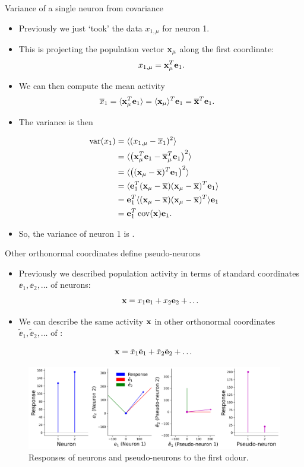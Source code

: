 \documentclass[presentation,smaller]{beamer}
\begin{document}
\begin{frame}[label={sec:org445c9ca}]{Variance of a single neuron from covariance}
\begin{itemize}
\item Previously we just `took' the data \(x_{1,\mu}\)  for neuron 1.
\item This is projecting the population vector \(\mathbf{x}_\mu\) along the first coordinate: $$x_{1,\mu} = \mathbf{x}_\mu^T \mathbf e_1.$$
\item We can then compute the mean activity
\begin{align*}
\overline{x}_1 &= \langle \mathbf{x}_\mu^T \mathbf e_1 \rangle = \langle \mathbf{x}_\mu \rangle^T \mathbf e_1 = \overline{\mathbf{x}}^T  \mathbf e_1.
\end{align*}
\item The variance is then
\end{itemize}
\begin{align*}
 \operatorname{var}(x_1) &= \langle (x_{1,\mu}- \overline{x}_1)^2 \rangle \\
&= \langle \left( \mathbf{x}_\mu^T \mathbf e_1  - \overline{\mathbf{x}}_\mu^T \mathbf e_1 \right)^2 \rangle\\
&= \langle \left( (\mathbf{x}_\mu - \overline{\mathbf{x}})^T\mathbf e_1 \right)^2 \rangle\\
&= \langle \mathbf e_1^T(\mathbf{x}_\mu - \overline{\mathbf{x}})  (\mathbf{x}_\mu - \overline{\mathbf{x}})^T\mathbf e_1  \rangle\\
&= \mathbf e_1^T \langle (\mathbf{x}_\mu - \overline{\mathbf{x}}) (\mathbf{x}_\mu - \overline{\mathbf{x}})^T \rangle \mathbf e_1\\
&= \mathbf e_1^T \operatorname{cov}(\mathbf{x}) \mathbf e_1.
\end{align*}
\begin{itemize}
\item So, the variance of neuron 1 is .
\end{itemize}
\end{frame}
\begin{frame}[label={sec:orge0efba3}]{Other orthonormal coordinates define pseudo-neurons}
\begin{itemize}
\item Previously we described population activity in terms of standard coordinates \(\ee_1, \ee_2, \dots\) of neurons:
$$ \mathbf{x} = x_1 \mathbf e_1 + x_2 \mathbf e_2 + \dots $$
\item We can describe the same activity \(\mathbf{x}\) in other orthonormal coordinates \(\tilde \ee_1, \tilde \ee_2, \dots\) of :
\end{itemize}
$$ \mathbf{x} = \tilde x_1 \tilde {\mathbf e}_1 + \tilde x_2 \tilde {\mathbf e}_2 + \dots $$
\begin{figure}[htbp]
\centering
\includegraphics[width=1.0\textwidth]{figures/coordinate_transform.png}
\caption{Responses of neurons and pseudo-neurons to the first odour.}
\end{figure}
\end{frame}
\end{document}
